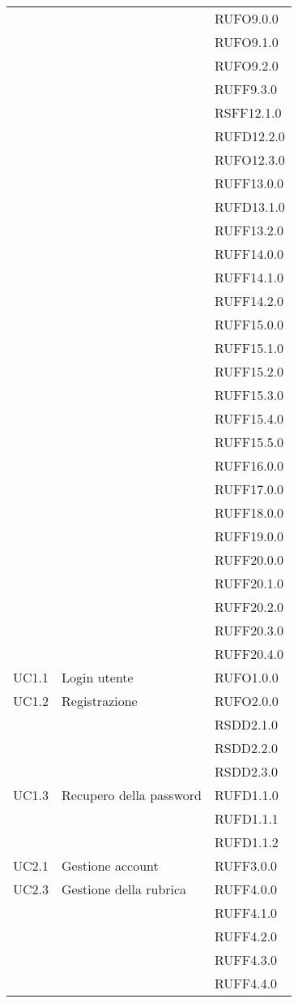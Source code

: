 \begin{longtable}{lp{}l}
 &  & RUFO9.0.0 \\
 &  & RUFO9.1.0 \\
 &  & RUFO9.2.0 \\
 &  & RUFF9.3.0 \\
 &  & RSFF12.1.0 \\
 &  & RUFD12.2.0 \\
 &  & RUFO12.3.0 \\
 &  & RUFF13.0.0 \\
 &  & RUFD13.1.0 \\
 &  & RUFF13.2.0 \\
 &  & RUFF14.0.0 \\
 &  & RUFF14.1.0 \\
 &  & RUFF14.2.0 \\
 &  & RUFF15.0.0 \\
 &  & RUFF15.1.0 \\
 &  & RUFF15.2.0 \\
 &  & RUFF15.3.0 \\
 &  & RUFF15.4.0 \\
 &  & RUFF15.5.0 \\
 &  & RUFF16.0.0 \\
 &  & RUFF17.0.0 \\
 &  & RUFF18.0.0 \\
 &  & RUFF19.0.0 \\
 &  & RUFF20.0.0 \\
 &  & RUFF20.1.0 \\
 &  & RUFF20.2.0 \\
 &  & RUFF20.3.0 \\
 &  & RUFF20.4.0 \\
UC1.1 & Login utente & RUFO1.0.0 \\
UC1.2 & Registrazione & RUFO2.0.0 \\
 &  & RSDD2.1.0 \\
 &  & RSDD2.2.0 \\
 &  & RSDD2.3.0 \\
UC1.3 & Recupero della password & RUFD1.1.0 \\
 &  & RUFD1.1.1 \\
 &  & RUFD1.1.2 \\
UC2.1 & Gestione account & RUFF3.0.0 \\
UC2.3 & Gestione della rubrica & RUFF4.0.0 \\
 &  & RUFF4.1.0 \\
 &  & RUFF4.2.0 \\
 &  & RUFF4.3.0 \\
 &  & RUFF4.4.0 \\

\end{longtable}
